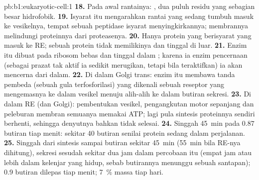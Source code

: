 \begin{solution}{pb:b1:eukaryotic-cell:1}
\textbf{18.} Pada awal rantainya: , dua puluh residu
yang sebagian besar hidrofobik.
\textbf{19.} Isyarat itu mengarahkan rantai yang sedang tumbuh masuk ke
vesikelnya, tempat sebuah peptidase isyarat menyingkirkannya;
membrannya melindungi proteinnya dari proteasenya.
\textbf{20.} Hanya protein yang berisyarat yang masuk ke RE; sebuah
protein  tidak memilikinya dan tinggal di luar.
\textbf{21.} Enzim itu dibuat pada ribosom bebas dan tinggal dalam
; karena ia enzim pencernaan (sebagai prazat tak aktif ia sedikit
merugikan, tetapi bila teraktifkan) ia akan mencerna  dari dalam.
\textbf{22.} Di dalam Golgi trans: enzim  itu membawa tanda
pembeda (sebuah gula terfosforilasi) yang dikenali sebuah reseptor yang
mengemasnya ke dalam vesikel menuju  alih-alih ke dalam butiran
sekresi.
\textbf{23.} Di dalam RE (dan Golgi): pembentukan vesikel, pengangkutan
motor sepanjang  dan peleburan membran semuanya memakai ATP;
lagi pula sintesis proteinnya sendiri berhenti, sehingga denyutnya
bahkan tidak selesai.
\textbf{24.} Singgah \qty{45}{min} pada $0.87$ butiran tiap menit:
sekitar \qty{40}{} butiran senilai protein sedang dalam perjalanan.
\textbf{25.} Singgah dari sintesis sampai butiran sekitar \qty{45}{min}
(\qty{55}{min} bila RE-nya dihitung), sekresi sesudah sekitar dua jam
dalam percobaan itu (empat jam atau lebih dalam kelenjar yang hidup,
sebab butirannya menunggu sebuah santapan); \qty{0.9}{} butiran dilepas
tiap menit; \qty{7}{\%} massa  tiap hari.
\end{solution}
